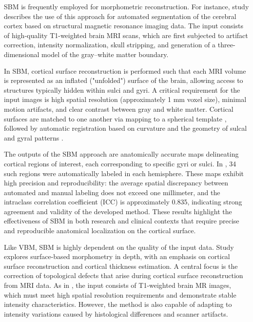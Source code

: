 \documentclass[default]{subfiles}
\begin{document}
SBM is frequently employed for morphometric reconstruction. For instance, study \cite{desikan_2006} describes the use
of this approach for automated segmentation of the cerebral cortex based on structural magnetic resonance imaging data.
The input consists of high-quality T1-weighted brain MRI scans, which are first subjected to artifact correction,
intensity normalization, skull stripping, and generation of a three-dimensional model of the gray–white matter
boundary.

In SBM, cortical surface reconstruction is performed such that each MRI volume is represented as an inflated
("unfolded") surface of the brain, allowing access to structures typically hidden within sulci and gyri. A critical
requirement for the input images is high spatial resolution (approximately 1 mm voxel size), minimal motion artifacts,
and clear contrast between gray and white matter. Cortical surfaces are matched to one another via mapping to a
spherical template \cite{fujita_2019}, followed by automatic registration based on curvature and the geometry of sulcal
and gyral patterns \cite{li_2023}.

The outputs of the SBM approach are anatomically accurate maps delineating cortical regions of interest, each
corresponding to specific gyri or sulci. In \cite{desikan_2006}, 34 such regions were automatically labeled in each
hemisphere. These maps exhibit high precision and reproducibility: the average spatial discrepancy between automated
and manual labeling does not exceed one millimeter, and the intraclass correlation coefficient (ICC) is approximately
0.835, indicating strong agreement and validity of the developed method. These results highlight the effectiveness of
SBM in both research and clinical contexts that require precise and reproducible anatomical localization on the
cortical surface.

Like VBM, SBM is highly dependent on the quality of the input data. Study \cite{fischl_2012} explores surface-based
morphometry in depth, with an emphasis on cortical surface reconstruction and cortical thickness estimation. A central
focus is the correction of topological defects that arise during cortical surface reconstruction from MRI data. As in
\cite{desikan_2006}, the input consists of T1-weighted brain MR images, which must meet high spatial resolution
requirements and demonstrate stable intensity characteristics. However, the method is also capable of adapting to
intensity variations caused by histological differences and scanner artifacts.
\end{document}
